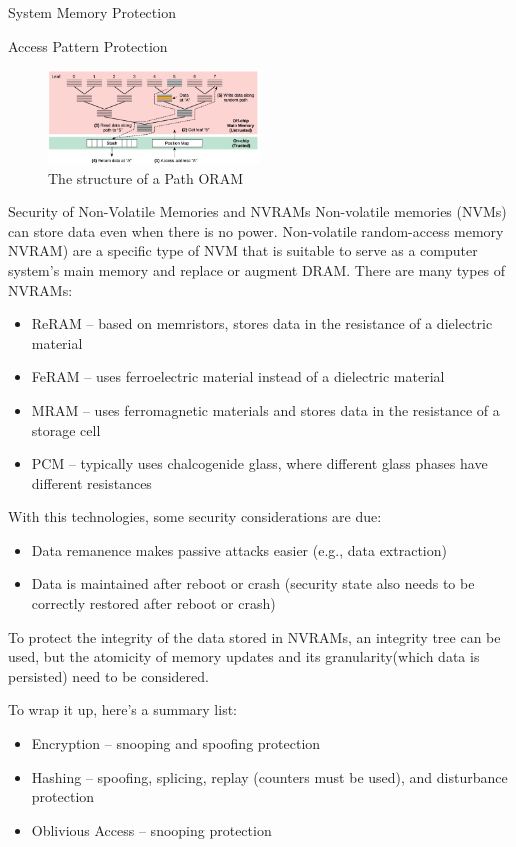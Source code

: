 \begin{section}{System Memory Protection}
\begin{subsection}{Access Pattern Protection}
    \begin{figure}[H]
      \centering
      \includegraphics[width=0.5\textwidth]{img/hardware/access pattern protection.png}
      \caption{The structure of a Path ORAM}
    \end{figure}

  \end{subsection}

  \begin{subsection}{Security of Non-Volatile Memories and NVRAMs}
    Non-volatile memories (NVMs) can store data even when there is no power. Non-volatile
    random-access memory NVRAM) are a specific type of NVM that is suitable to serve as a computer
    system’s main memory and replace or augment DRAM.
    There are many types of NVRAMs:
    \begin{itemize}
      \item ReRAM – based on memristors, stores data in the resistance of a dielectric material
      \item FeRAM – uses ferroelectric material instead of a dielectric material
      \item MRAM – uses ferromagnetic materials and stores data in the resistance of a storage cell
      \item PCM – typically uses chalcogenide glass, where different glass phases have different resistances
    \end{itemize}
    With this technologies, some security considerations are due:

    \begin{itemize}
      \item Data remanence makes passive attacks easier (e.g., data extraction)
      \item Data is maintained after reboot or crash (security state also needs to be correctly
        restored after reboot or crash)
    \end{itemize}

    To protect the integrity of the data stored in NVRAMs, an integrity tree can be used, but 
    the atomicity of memory updates and its granularity(which data is persisted) need to be
    considered.\\
  \end{subsection}
  To wrap it up, here's a summary list:
  \begin{itemize}
    \item Encryption – snooping and spoofing protection
    \item Hashing – spoofing, splicing, replay (counters must be used), and disturbance
    protection
    \item Oblivious Access – snooping protection
  \end{itemize}

\end{section}

